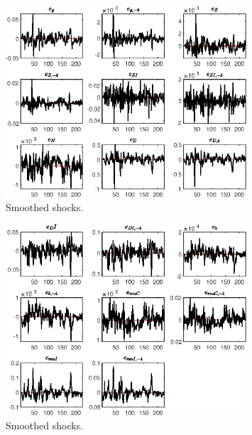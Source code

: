  
\begin{figure}[H]
\centering 
\includegraphics[width=0.80\textwidth]{BRS_sectoral_wo_vcu/graphs/BRS_sectoral_wo_vcu_SmoothedShocks1}
\caption{Smoothed shocks.}\label{Fig:SmoothedShocks:1}
\end{figure}

\begin{figure}[H]
\centering 
\includegraphics[width=0.80\textwidth]{BRS_sectoral_wo_vcu/graphs/BRS_sectoral_wo_vcu_SmoothedShocks2}
\caption{Smoothed shocks.}\label{Fig:SmoothedShocks:2}
\end{figure}


